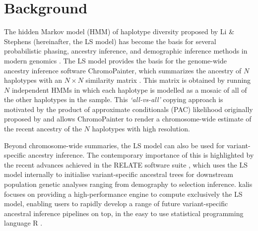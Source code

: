 \documentclass[pdflatex,referee,lineno,sn-nature]{sn-jnl}%
\let\proglang=\textsf
\newcommand{\pkg}[1]{{\fontseries{m}\fontseries{b}\selectfont #1}}
\begin{document}

\maketitle

\section*{Background}
\label{introduction}

The hidden Markov model (HMM) of haplotype diversity proposed by Li \& Stephens \cite{Li2213} (hereinafter, the LS model) has become the basis for several probabilistic phasing, ancestry inference, and demographic inference methods in modern genomics \cite{speidel,Song1005}.
The LS model provides the basis for the genome-wide ancestry inference software ChromoPainter, which summarizes the ancestry of \(N\) haplotypes with an \(N \times N\) similarity matrix \cite{lawson2012inference}.
This matrix is obtained by running \(N\) independent HMMs in which each haplotype is modelled as a mosaic of all of the other haplotypes in the sample.
This \emph{`all-vs-all'} copying approach is motivated by the product of approximate conditionals (PAC) likelihood originally proposed by \cite{Li2213} and allows ChromoPainter to render a chromosome-wide estimate of the recent ancestry of the \(N\) haplotypes with high resolution.

Beyond chromosome-wide summaries, the LS model can also be used for variant-specific ancestry inference.
The contemporary importance of this is highlighted by the recent advances achieved in the RELATE software suite \cite{speidel}, which uses the LS model internally to initialise variant-specific ancestral trees for downstream population genetic analyses ranging from demography to selection inference.
\pkg{kalis} focuses on providing a high-performance engine to compute exclusively the LS model, enabling users to rapidly develop a range of future variant-specific ancestral inference pipelines on top, in the easy to use statistical programming language \proglang{R} \cite{R}.
\end{document}
